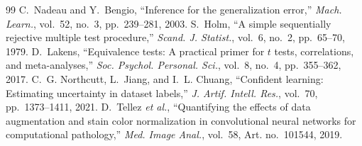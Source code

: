 \documentclass[conference]{IEEEtran}
\begin{document}
\begin{thebibliography}{99}
 C.~Nadeau and Y.~Bengio, ``Inference for the generalization error,'' \emph{Mach. Learn.}, vol.~52, no.~3, pp.~239--281, 2003.
 S.~Holm, ``A simple sequentially rejective multiple test procedure,'' \emph{Scand. J. Statist.}, vol.~6, no.~2, pp.~65--70, 1979.
 D.~Lakens, ``Equivalence tests: A practical primer for $t$ tests, correlations, and meta-analyses,'' \emph{Soc. Psychol. Personal. Sci.}, vol.~8, no.~4, pp.~355--362, 2017.
 C.~G. Northcutt, L.~Jiang, and I.~L. Chuang, ``Confident learning: Estimating uncertainty in dataset labels,'' \emph{J. Artif. Intell. Res.}, vol.~70, pp.~1373--1411, 2021.
 D.~Tellez \emph{et al.}, ``Quantifying the effects of data augmentation and stain color normalization in convolutional neural networks for computational pathology,'' \emph{Med. Image Anal.}, vol.~58, Art. no.~101544, 2019.
\end{thebibliography}
\end{document}
